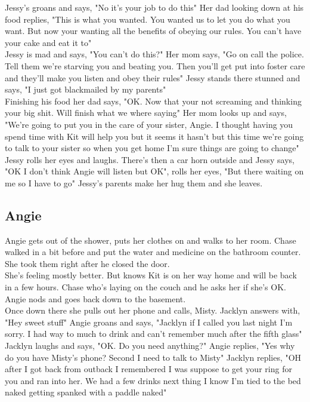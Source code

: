 \documentclass{article}[12px]
\begin{document}
	Jessy's groans and says, "No it's your job to do this" Her dad looking down at his food replies, "This is what you wanted. You wanted us to let you do what you want. But now your wanting all the benefits of obeying our rules. You can't have your cake and eat it to"\\
	
	Jessy is mad and says, "You can't do this?" Her mom says, "Go on call the police. Tell them we're starving you and beating you. Then you'll get put into foster care and they'll make you listen and obey their rules" Jessy stands there stunned and says, "I just got blackmailed by my parents"\\
	
	Finishing his food her dad says, "OK. Now that your not screaming and thinking your big shit. Will finish what we where saying" Her mom looks up and says, "We're going to put you in the care of your sister, Angie. I thought having you spend time with Kit will help you but it seems it hasn't but this time we're going to talk to your sister so when you get home I'm sure things are going to change" Jessy rolls her eyes and laughs. There's then a car horn outside and Jessy says, "OK I don't think Angie will listen but OK", rolls her eyes, "But there waiting on me so I have to go" Jessy's parents make her hug them and she leaves.\\
\subsection* {Angie}
	Angie gets out of the shower, puts her clothes on and walks to her room. Chase walked in a bit before and put the water and medicine on the bathroom counter. She took them right after he closed the door.\\
	
	She's feeling mostly better. But knows Kit is on her way home and will be back in a few hours. Chase who's laying on the couch and he asks her if she's OK. Angie nods and goes back down to the basement.\\
	
	Once down there she pulls out her phone and calls, Misty. Jacklyn answers with, "Hey sweet stuff" Angie groans and says, "Jacklyn if I called you last night I'm sorry. I had way to much to drink and can't remember much after the fifth glass" Jacklyn laughs and says, "OK. Do you need anything?" Angie replies, "Yes why do you have Misty's phone? Second I need to talk to Misty" Jacklyn replies, "OH after I got back from outback I remembered I was suppose to get your ring for you and ran into her. We had a few drinks next thing I know I'm tied to the bed naked getting spanked with a paddle naked" \\
	
\end{document}
